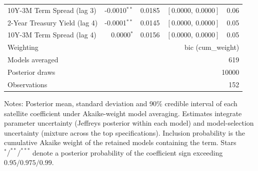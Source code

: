 \begin{table}[!htbp]
\begin{tabular}{lrrrr}
10Y-3M Term Spread (lag 3) & -0.0010$^{**}$ & 0.0185 & $[0.0000,\ 0.0000]$ & 0.06 \\
2-Year Treasury Yield (lag 4) & -0.0001$^{**}$ & 0.0145 & $[0.0000,\ 0.0000]$ & 0.05 \\
10Y-3M Term Spread (lag 4) & 0.0000$^{*}$ & 0.0156 & $[0.0000,\ 0.0000]$ & 0.05 \\
\midrule
Weighting & \multicolumn{4}{r}{bic (cum_weight)} \\
Models averaged & \multicolumn{4}{r}{619} \\
Posterior draws & \multicolumn{4}{r}{10000} \\
Observations & \multicolumn{4}{r}{152} \\
\bottomrule
\end{tabular}
\begin{tablenotes}\small
\item Notes: Posterior mean, standard deviation and 90\% credible interval of each satellite coefficient under Akaike-weight model averaging. Estimates integrate parameter uncertainty (Jeffreys posterior within each model) and model-selection uncertainty (mixture across the top specifications). Inclusion probability is the cumulative Akaike weight of the retained models containing the term. Stars $^{*}/^{**}/^{***}$ denote a posterior probability of the coefficient sign exceeding $0.95/0.975/0.99$.
\end{tablenotes}
\end{table}
